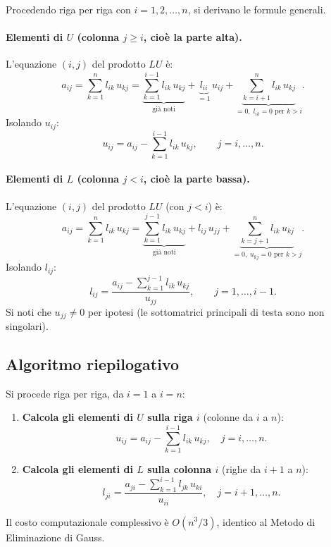 \documentclass[a4paper,12pt]{article}
\theoremstyle{definition}
\theoremstyle{remark}
\begin{document}
Procedendo riga per riga con $i = 1, 2, \ldots, n$, si derivano le formule generali.

\paragraph{Elementi di $U$ (colonna $j \ge i$, cioè la parte alta).}
L'equazione $(i,j)$ del prodotto $LU$ è:
\[
  a_{ij}
    = \sum_{k=1}^{n} l_{ik}\,u_{kj}
    = \underbrace{\sum_{k=1}^{i-1} l_{ik}\,u_{kj}}_{\text{già noti}}
      + \underbrace{l_{ii}}_{=1}\,u_{ij}
      + \underbrace{\sum_{k=i+1}^{n} l_{ik}\,u_{kj}}_{=0,\; l_{ik}=0\text{ per }k>i}.
\]
Isolando $u_{ij}$:
\begin{equation}
  \boxed{
    u_{ij} = a_{ij} - \sum_{k=1}^{i-1} l_{ik}\,u_{kj},
    \qquad j = i, \ldots, n.
  }
\end{equation}

\paragraph{Elementi di $L$ (colonna $j < i$, cioè la parte bassa).}
L'equazione $(i,j)$ del prodotto $LU$ (con $j < i$) è:
\[
  a_{ij}
    = \sum_{k=1}^{n} l_{ik}\,u_{kj}
    = \underbrace{\sum_{k=1}^{j-1} l_{ik}\,u_{kj}}_{\text{già noti}}
      + l_{ij}\,u_{jj}
      + \underbrace{\sum_{k=j+1}^{n} l_{ik}\,u_{kj}}_{=0,\; u_{kj}=0\text{ per }k>j}.
\]
Isolando $l_{ij}$:
\begin{equation}
  \boxed{
    l_{ij} = \frac{\displaystyle a_{ij} - \sum_{k=1}^{j-1} l_{ik}\,u_{kj}}{u_{jj}},
    \qquad j = 1, \ldots, i-1.
  }
\end{equation}
Si noti che $u_{jj} \neq 0$ per ipotesi (le sottomatrici principali di testa sono
non singolari).

\subsection{Algoritmo riepilogativo}

Si procede riga per riga, da $i = 1$ a $i = n$:
\begin{enumerate}
  \item \textbf{Calcola gli elementi di $U$ sulla riga $i$} (colonne da $i$ a $n$):
        \[
          u_{ij} = a_{ij} - \sum_{k=1}^{i-1} l_{ik}\,u_{kj}, \quad j = i, \ldots, n.
        \]
  \item \textbf{Calcola gli elementi di $L$ sulla colonna $i$} (righe da $i+1$ a $n$):
        \[
          l_{ji} = \frac{a_{ji} - \displaystyle\sum_{k=1}^{i-1} l_{jk}\,u_{ki}}{u_{ii}},
          \quad j = i+1, \ldots, n.
        \]
\end{enumerate}
Il costo computazionale complessivo è $O(n^3/3)$, identico al Metodo di
Eliminazione di Gauss.
\end{document}
